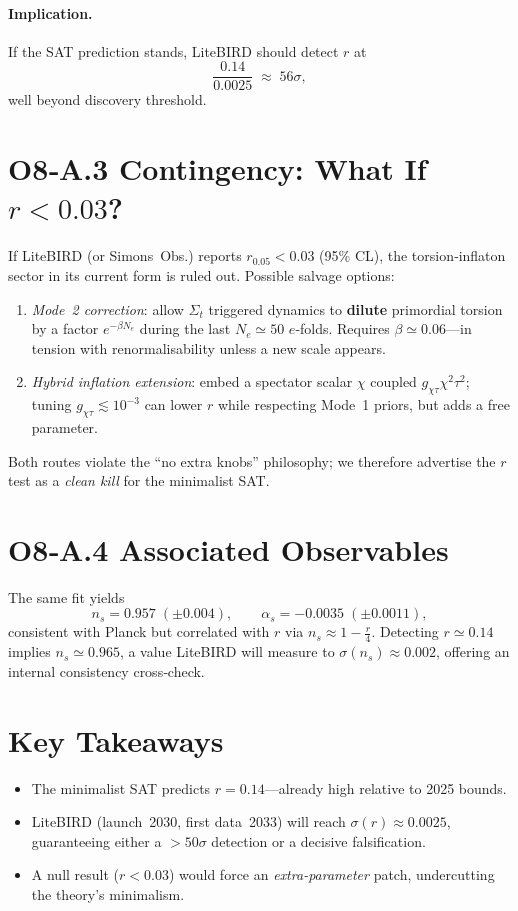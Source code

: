 \documentclass[12pt]{article}
\begin{document}
\paragraph{Implication.}
If the SAT prediction stands, LiteBIRD should detect $r$ at
\[
  \frac{0.14}{0.0025} \;\approx\; 56\sigma,
\]
well beyond discovery threshold.

\section*{O8‑A.3 \quad Contingency: What If $r<0.03$?}
If LiteBIRD (or Simons Obs.) reports $r_{0.05}<0.03$ (95\% CL),
the torsion‑inflaton sector in its current form is ruled out.
Possible salvage options:
\begin{enumerate}
  \item \emph{Mode 2 correction}: allow $\Sigma_t$ triggered dynamics to
        \textbf{dilute} primordial torsion by a factor
        $e^{-\beta N_e}$ during the last $N_e\simeq50$
        $e$‑folds.  Requires $\beta\simeq0.06$—in tension with
        renormalisability unless a new scale appears.
  \item \emph{Hybrid inflation extension}: embed a spectator scalar
        $\chi$ coupled $g_{\chi\tau}\chi^2\tau^2$; tuning $g_{\chi\tau}\lesssim10^{-3}$ can
        lower $r$ while respecting Mode 1 priors, but adds a free parameter.
\end{enumerate}
Both routes violate the ``no extra knobs'' philosophy; we therefore
advertise the $r$ test as a \emph{clean kill} for the minimalist SAT.

\section*{O8‑A.4 \quad Associated Observables}
The same fit yields 
\[
  n_s = 0.957\;(\pm0.004), \qquad
  \alpha_s = -0.0035\;(\pm0.0011),
\]
consistent with Planck but correlated with $r$ via
$n_s \approx 1 - \frac{r}{4}$.  
Detecting $r\simeq0.14$ implies $n_s\simeq0.965$, a value LiteBIRD
will measure to $\sigma(n_s)\approx0.002$, offering an internal
consistency cross‑check.

\section*{Key Takeaways}
\begin{itemize}
  \item The minimalist SAT predicts $r=0.14$—already high relative to 2025 bounds.
  \item LiteBIRD (launch 2030, first data 2033) will reach $\sigma(r)\approx0.0025$,
        guaranteeing either a $>50\sigma$ detection or a decisive falsification.
  \item A null result ($r<0.03$) would force an \emph{extra‑parameter} patch, undercutting the theory’s minimalism.
\end{itemize}
\end{document}

